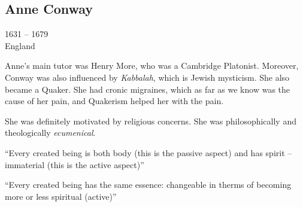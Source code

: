 \documentclass{article}
\begin{document}
    \begin{spacing}{1.2}
    \newpage
        \section*{Anne Conway}
        \begin{flushright}
            1631 -- 1679\\
            England
        \end{flushright}
        Anne's main tutor was Henry More, who was a Cambridge Platonist. Moreover, Conway was also influenced by \emph{Kabbalah}, which is Jewish mysticism. She also became a Quaker. She had cronic migraines, which as far as we know was the cause of her pain, and Quakerism helped her with the pain. 

        She was definitely motivated by religious concerns. She was philosophically and theologically \emph{ecumenical}.

        ``Every created being is both body (this is the passive aspect) and has spirit -- immaterial (this is the active aspect)''

        ``Every created being has the same essence: changeable in therms of becoming more or less spiritual (active)''
    \end{spacing}
    
\end{document}
